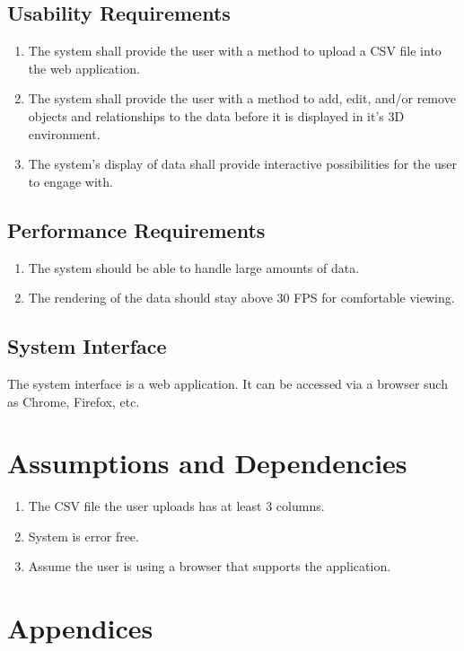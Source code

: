 \documentclass[letterpaper,10pt,titlepage, onecolumn, draftclsnofoot]{IEEEtran}
\begin{document}
    \subsection{Usability Requirements}
    \begin{enumerate}
        \item The system shall provide the user with a method to upload a CSV file into the web application. 
        \item The system shall provide the user with a method to add, edit, and/or remove objects and relationships to the data before it is displayed in it's 3D environment.
        \item The system's display of data shall provide interactive possibilities for the user to engage with.
    \end{enumerate}
        
    \subsection{Performance Requirements}
    \begin{enumerate}
        \item The system should be able to handle large amounts of data.
        \item The rendering of the data should stay above 30 FPS for comfortable viewing.
    \end{enumerate}
    
    \subsection{System Interface}
    \noindent The system interface is a web application. It can be accessed via a browser such as Chrome, Firefox, etc.
 
 
\section{Assumptions and Dependencies}
\begin{enumerate}
    \item The CSV file the user uploads has at least 3 columns.
    \item System is error free.
    \item Assume the user is using a browser that supports the application.
\end{enumerate}
    
\section{Appendices}
\end{document}
